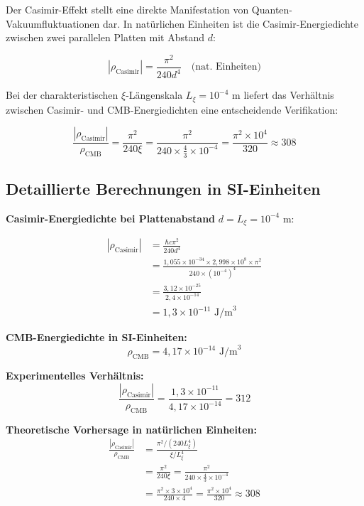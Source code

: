 \documentclass[12pt,a4paper]{article}
\begin{document}
	Der Casimir-Effekt stellt eine direkte Manifestation von Quanten-Vakuumfluktuationen dar. In natürlichen Einheiten ist die Casimir-Energiedichte zwischen zwei parallelen Platten mit Abstand $d$:
	
	\begin{equation}
		|\rho_{\text{Casimir}}| = \frac{\pi^2}{240 d^4} \quad \text{(nat. Einheiten)}
	\end{equation}
	
	Bei der charakteristischen $\xi$-Längenskala $L_\xi = 10^{-4}$ m liefert das Verhältnis zwischen Casimir- und CMB-Energiedichten eine entscheidende Verifikation:
	
	\begin{equation}
		\frac{|\rho_{\text{Casimir}}|}{\rho_{\text{CMB}}} = \frac{\pi^2}{240 \xi} = \frac{\pi^2}{240 \times \frac{4}{3} \times 10^{-4}} = \frac{\pi^2 \times 10^4}{320} \approx 308
	\end{equation}
	
	\subsection{Detaillierte Berechnungen in SI-Einheiten}
	
	\textbf{Casimir-Energiedichte bei Plattenabstand} $d = L_\xi = 10^{-4}$ m:
	
	\begin{align}
		|\rho_{\text{Casimir}}| &= \frac{\hbar c \pi^2}{240 d^4} \\
		&= \frac{1,055 \times 10^{-34} \times 2,998 \times 10^8 \times \pi^2}{240 \times (10^{-4})^4} \\
		&= \frac{3,12 \times 10^{-25}}{2,4 \times 10^{-14}} \\
		&= 1,3 \times 10^{-11} \text{ J/m}^3
	\end{align}
	
	\textbf{CMB-Energiedichte in SI-Einheiten:}
	\begin{equation}
		\rho_{\text{CMB}} = 4,17 \times 10^{-14} \text{ J/m}^3
	\end{equation}
	
	\textbf{Experimentelles Verhältnis:}
	\begin{equation}
		\frac{|\rho_{\text{Casimir}}|}{\rho_{\text{CMB}}} = \frac{1,3 \times 10^{-11}}{4,17 \times 10^{-14}} = 312
	\end{equation}
	
	\textbf{Theoretische Vorhersage in natürlichen Einheiten:}
	\begin{align}
		\frac{|\rho_{\text{Casimir}}|}{\rho_{\text{CMB}}} &= \frac{\pi^2 / (240 L_\xi^4)}{\xi / L_\xi^4} \\
		&= \frac{\pi^2}{240 \xi} = \frac{\pi^2}{240 \times \frac{4}{3} \times 10^{-4}} \\
		&= \frac{\pi^2 \times 3 \times 10^4}{240 \times 4} = \frac{\pi^2 \times 10^4}{320} \approx 308
	\end{align}
	
\end{document}
